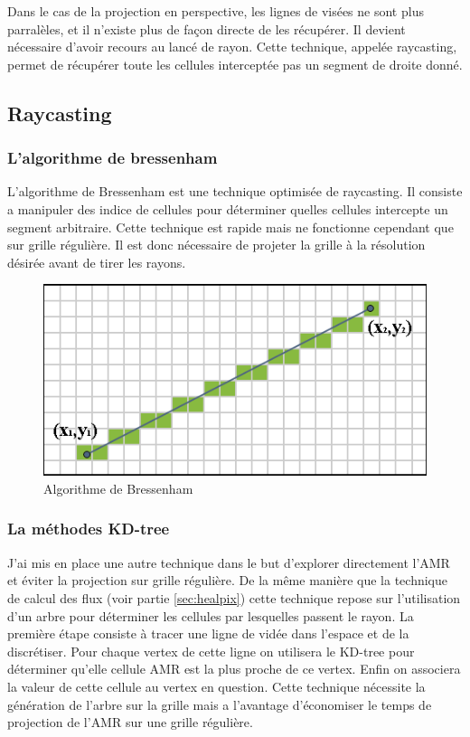 Dans le cas de la projection en perspective, les lignes de visées ne sont plus parralèles, et il n'existe plus de façon directe de les récupérer.
Il devient nécessaire d'avoir recours au lancé de rayon.
Cette technique, appelée raycasting, permet de récupérer toute les cellules interceptée pas un segment de droite donné.

\subsection{Raycasting}
\subsubsection{L'algorithme de bressenham}
L'algorithme de Bressenham est une technique optimisée de raycasting.
Il consiste a manipuler des indice de cellules pour déterminer quelles cellules intercepte un segment arbitraire.
Cette technique est rapide mais ne fonctionne cependant que sur grille régulière.
Il est donc nécessaire de projeter la grille à la résolution désirée avant de tirer les rayons.

\begin{figure}[bth]
        \includegraphics[width=.95\linewidth]{img/04/Bresenham_line.png} 
        \caption[Algorithme de Bressenham]{Algorithme de Bressenham }
 		\label{fig:bressenham}
\end{figure}

\subsubsection{La méthodes KD-tree}

J'ai mis en place une autre technique dans le but d'explorer directement l'\ac{AMR} et éviter la projection sur grille régulière.
De la même manière que la technique de calcul des flux (voir partie \ref{sec:healpix}) cette technique repose sur l'utilisation d'un arbre pour déterminer les cellules par lesquelles passent le rayon.
La première étape consiste à tracer une ligne de vidée dans l'espace et de la discrétiser.
Pour chaque vertex de cette ligne on utilisera le KD-tree pour déterminer qu'elle cellule \ac{AMR} est la plus proche de ce vertex.
Enfin on associera la valeur de cette cellule au vertex en question.
Cette technique nécessite la génération de l'arbre sur la grille mais a l'avantage d'économiser le temps de projection de l'\ac{AMR} sur une grille régulière.


